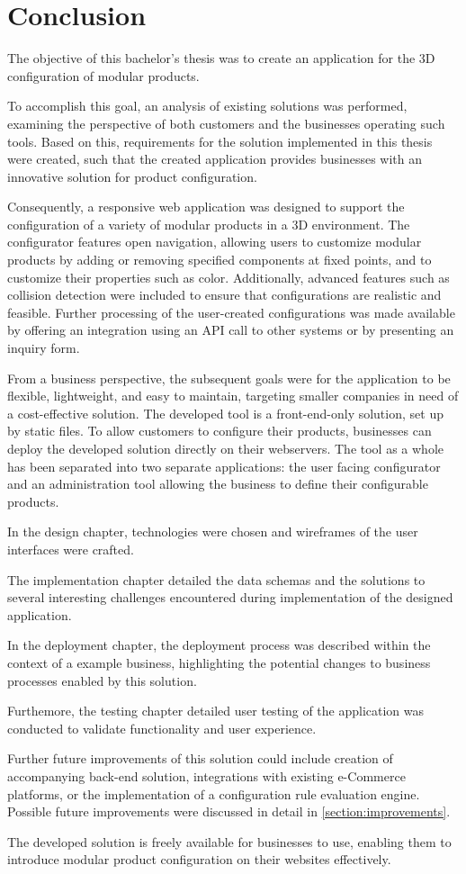 \chapter{Conclusion}

The objective of this bachelor's thesis was to create an application for the 3D configuration of modular products.

To accomplish this goal, an analysis of existing solutions was performed, examining the perspective of both customers and the businesses operating such tools. Based on this, requirements for the solution implemented in this thesis were created, such that the created application provides businesses with an innovative solution for product configuration.

Consequently, a responsive web application was designed to support the configuration of a variety of modular products in a 3D environment. The configurator features open navigation, allowing users to customize modular products by adding or removing specified components at fixed points, and to customize their properties such as color. Additionally, advanced features such as collision detection were included to ensure that configurations are realistic and feasible. Further processing of the user-created configurations was made available by offering an integration using an API call to other systems or by presenting an inquiry form.

From a business perspective, the subsequent goals were for the  application to be flexible, lightweight, and easy to maintain, targeting smaller companies in need of a cost-effective solution. The developed tool is a front-end-only solution, set up by static files. To allow customers to configure their products, businesses can deploy the developed solution directly on their webservers. The tool as a whole has been separated into two separate applications: the user facing configurator and an administration tool allowing the business to define their configurable products.

In the design chapter, technologies were chosen and wireframes of the user interfaces were crafted.

The implementation chapter detailed the data schemas and the solutions to several interesting challenges encountered during implementation of the designed application.

In the deployment chapter, the deployment process was described within the context of a example business, highlighting the potential changes to business processes enabled by this solution.

Furthemore, the testing chapter detailed user testing of the application was conducted to validate functionality and user experience.

Further future improvements of this solution could include creation of accompanying back-end solution, integrations with existing e-Commerce platforms, or the implementation of a configuration rule evaluation engine. Possible future improvements were discussed in detail in \autoref{section:improvements}.

The developed solution is freely available for businesses to use, enabling them to introduce modular product configuration on their websites effectively.

